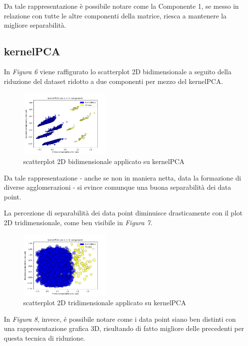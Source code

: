 \documentclass[11pt,a4paper,twocolumn]{article}
\begin{document}
	Da tale rappresentazione è possibile notare come la Componente 1, se messo in relazione con tutte le altre componenti della matrice, riesca a mantenere la migliore separabilità.


	\subsection{kernelPCA}

	In \emph{Figura 6} viene raffigurato lo scatterplot 2D bidimensionale a seguito della riduzione del dataset ridotto a due componenti per mezzo del kernelPCA.

	\begin{figure}[h]
		\centering
		\includegraphics[width=0.4\textwidth]{img/kernelPCA_2Dnc2.png}
		\caption{scatterplot 2D bidimensionale applicato su kernelPCA}
	\end{figure}

	Da tale rappresentazione - anche se non in maniera netta, data la formazione di diverse agglomerazioni - si evince comunque una buona separabilità dei data point. \par

	La percezione di separabilità dei data point diminuisce drasticamente con il plot 2D tridimensionale, come ben visibile in \emph{Figura 7}.

	\begin{figure}[h]
		\centering
		\includegraphics[width=0.4\textwidth]{img/kernelPCA_2Dnc3.png}
		\caption{scatterplot 2D tridimensionale applicato su kernelPCA}
	\end{figure}

	In \emph{Figura 8}, invece, é possibile notare come i data point siano ben distinti con una rappresentazione grafica 3D, risultando di fatto migliore delle precedenti per questa tecnica di riduzione.
\end{document}
